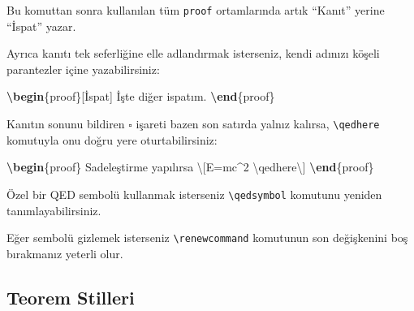 \documentclass[
  10pt,
]{scrbook}
\newenvironment{Shaded}{}{}
\newcommand{\ExtensionTok}[1]{#1}
\newcommand{\FunctionTok}[1]{\textcolor[rgb]{0.02,0.16,0.49}{#1}}
\newcommand{\KeywordTok}[1]{\textcolor[rgb]{0.00,0.44,0.13}{\textbf{#1}}}
\newcommand{\NormalTok}[1]{#1}
\newcommand{\SpecialCharTok}[1]{\textcolor[rgb]{0.25,0.44,0.63}{#1}}
\newcommand{\SpecialStringTok}[1]{\textcolor[rgb]{0.73,0.40,0.53}{#1}}
\theoremstyle{definition}
\theoremstyle{definition}
\theoremstyle{definition}
\theoremstyle{definition}
\theoremstyle{remark}
\begin{document}
Bu komuttan sonra kullanılan tüm \texttt{proof} ortamlarında artık ``Kanıt'' yerine ``İspat'' yazar.

Ayrıca kanıtı tek seferliğine elle adlandırmak isterseniz, kendi adınızı köşeli parantezler içine yazabilirsiniz:

\begin{Shaded}
\begin{Highlighting}[]
\KeywordTok{\textbackslash{}begin}\NormalTok{\{}\ExtensionTok{proof}\NormalTok{\}[İspat]}
\NormalTok{ İşte diğer ispatım.}
\KeywordTok{\textbackslash{}end}\NormalTok{\{}\ExtensionTok{proof}\NormalTok{\}}
\end{Highlighting}
\end{Shaded}

Kanıtın sonunu bildiren \(\square\) işareti bazen son satırda yalnız kalırsa, \texttt{\textbackslash{}qedhere} komutuyla onu doğru yere oturtabilirsiniz:

\begin{Shaded}
\begin{Highlighting}[]
\KeywordTok{\textbackslash{}begin}\NormalTok{\{}\ExtensionTok{proof}\NormalTok{\}}
\NormalTok{ Sadeleştirme yapılırsa }\SpecialStringTok{\textbackslash{}[E=mc\^{}2 }\SpecialCharTok{\textbackslash{}qedhere}\SpecialStringTok{\textbackslash{}]}
\KeywordTok{\textbackslash{}end}\NormalTok{\{}\ExtensionTok{proof}\NormalTok{\}}
\end{Highlighting}
\end{Shaded}

Özel bir QED sembolü kullanmak isterseniz \texttt{\textbackslash{}qedsymbol} komutunu yeniden tanımlayabilirsiniz.

\begin{Shaded}
\end{Shaded}

Eğer sembolü gizlemek isterseniz \texttt{\textbackslash{}renewcommand} komutunun son değişkenini boş bırakmanız yeterli olur.

\hypertarget{teorem-stilleri}{%
\subsection{Teorem Stilleri}\label{teorem-stilleri}}
\end{document}
